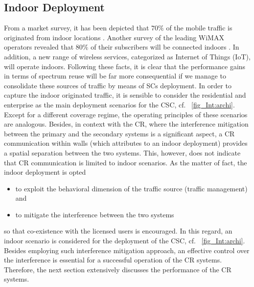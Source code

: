 \subsection{Indoor Deployment}
From a market survey, it has been depicted that $70\%$ of the mobile traffic is originated from indoor locations \cite{Chander08}. Another survey of the leading WiMAX operators revealed that $80\%$ of their subscribers will be connected indoors \cite{Pao07}. In addition, a new range of wireless services, categorized as Internet of Things (IoT), will operate indoors. Following these facts, it is clear that the performance gains in terms of spectrum reuse will be far more consequential if we manage to consolidate these sources of traffic by means of SCs deployment. In order to capture the indoor originated traffic, it is sensible to consider the residential and enterprise as the main deployment scenarios for the CSC, cf. \figurename~\ref{fig_Int:archi}. Except for a different coverage regime, the operating principles of these scenarios are analogous. Besides, in context with the CR, where the interference mitigation between the primary and the secondary systems is a significant aspect, a CR communication within walls (which attributes to an indoor deployment) provides a spatial separation between the two systems. This, however, does not indicate that CR communication is limited to indoor scenarios. As the matter of fact, the indoor deployment is opted \begin{itemize} \item to exploit the behavioral dimension of the traffic source (traffic management) and \item to mitigate the interference between the two systems \end{itemize} so that co-existence with the licensed users is encouraged.
In this regard, an indoor scenario is considered for the deployment of the CSC, cf. \figurename~\ref{fig_Int:archi}. Besides employing such interference mitigation approach, an effective control over the interference is essential for a successful operation of the CR systems. Therefore, the next section extensively discusses the performance of the CR systems.


